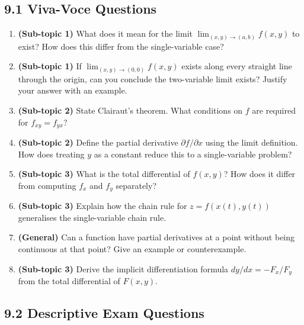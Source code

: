 \documentclass[12pt,a4paper]{article}
\begin{document}
\subsection*{9.1 Viva-Voce Questions}

\begin{enumerate}
  \item \textbf{(Sub-topic 1)} What does it mean for the limit \(\lim_{(x,y)\to(a,b)} f(x,y)\) to exist? How does this differ from the single-variable case?

  \item \textbf{(Sub-topic 1)} If \(\lim_{(x,y)\to(0,0)} f(x,y)\) exists along every straight line through the origin, can you conclude the two-variable limit exists? Justify your answer with an example.

  \item \textbf{(Sub-topic 2)} State Clairaut's theorem. What conditions on \(f\) are required for \(f_{xy} = f_{yx}\)?

  \item \textbf{(Sub-topic 2)} Define the partial derivative \(\partial f/\partial x\) using the limit definition. How does treating \(y\) as a constant reduce this to a single-variable problem?

  \item \textbf{(Sub-topic 3)} What is the total differential of \(f(x,y)\)? How does it differ from computing \(f_x\) and \(f_y\) separately?

  \item \textbf{(Sub-topic 3)} Explain how the chain rule for \(z = f(x(t), y(t))\) generalises the single-variable chain rule.

  \item \textbf{(General)} Can a function have partial derivatives at a point without being continuous at that point? Give an example or counterexample.

  \item \textbf{(Sub-topic 3)} Derive the implicit differentiation formula \(dy/dx = -F_x/F_y\) from the total differential of \(F(x,y)\).
\end{enumerate}

\subsection*{9.2 Descriptive Exam Questions}
\end{document}
